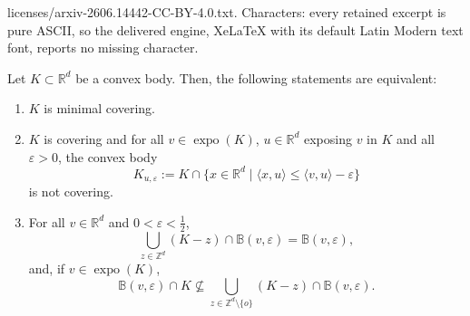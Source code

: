 \documentclass[10pt,a4paper]{amsart}
\DeclareMathOperator{\expo}{expo}
\newcommand{\RR}{\mathbb{R}}
\newcommand{\ZZ}{\mathbb{Z}}
\newcommand{\ball}{\mathbb{B}}
\newcommand{\origin}{o}
\begin{document}
licenses/arxiv-2606.14442-CC-BY-4.0.txt. Characters: every retained excerpt is pure ASCII, so the delivered engine, XeLaTeX with its default Latin Modern text font, reports no missing character.
\begin{lemma}
\label{lemma:balls_lemma} Let $K\subset \RR^d$ be a convex body. Then, the following statements are equivalent:
\begin{enumerate}
\item $K$ is minimal covering.
\item $K$ is covering and for all $v\in \expo(K)$, $u\in \RR^d$ exposing $v$ in $K$ and all $\varepsilon>0$, the convex body
$$K_{u, \varepsilon}:=K\cap \{x\in \RR^d \; | \; \langle x,u\rangle \leq \langle v,u\rangle-\varepsilon \}$$
is not covering.
\item For all $v\in \RR^d$ and $0<\varepsilon<\frac{1}{2}$, 
\begin{equation}\label{eq:balls_covering}
\bigcup \limits_{z\in \ZZ^d} (K-z) \cap \ball (v, \varepsilon)=\ball(v,\varepsilon),
\end{equation}
and, if $v\in\expo(K)$,
\begin{equation}\label{eq:balls_condition}
\ball(v,\varepsilon)\cap K \not\subseteq\bigcup \limits_{z\in \ZZ^d\setminus \{\origin\}} (K-z) \cap \ball (v, \varepsilon).
\end{equation}
\end{enumerate}
\end{lemma}
\end{document}
